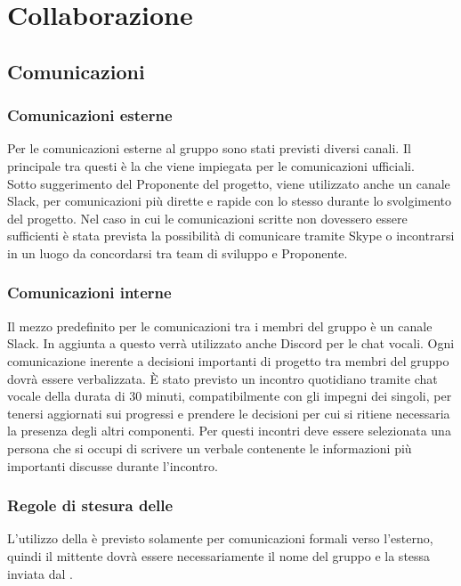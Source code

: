 \section{Collaborazione}
\subsection{Comunicazioni}
\subsubsection{Comunicazioni esterne}
Per le comunicazioni esterne al gruppo sono stati previsti diversi canali.
Il principale tra questi è la \email{} \href{mailto:\GroupEmail}{\GroupEmail}{} che viene impiegata per le comunicazioni ufficiali.\\
Sotto suggerimento del Proponente del progetto, viene utilizzato anche un canale Slack, per comunicazioni più dirette e rapide con lo stesso durante lo svolgimento del progetto. Nel caso in cui le comunicazioni scritte non dovessero essere sufficienti è stata prevista la possibilità di comunicare tramite Skype o incontrarsi in un luogo da concordarsi tra team di sviluppo e Proponente.

\subsubsection{Comunicazioni interne} \label{sec:comunicazioni_interne}
Il mezzo predefinito per le comunicazioni tra i membri del gruppo è un canale Slack.
In aggiunta a questo verrà utilizzato anche Discord per le chat vocali.
Ogni comunicazione inerente a decisioni importanti di progetto tra membri del gruppo dovrà essere verbalizzata.
È stato previsto un incontro quotidiano tramite chat vocale della durata di 30 minuti, compatibilmente con gli impegni dei singoli, per tenersi aggiornati sui progressi e prendere le decisioni per cui si ritiene necessaria la presenza degli altri componenti. Per questi incontri deve essere selezionata una persona che si occupi di scrivere un verbale contenente le informazioni più importanti discusse durante l'incontro.

\subsubsection{Regole di stesura delle \email}
L'utilizzo della \email{} è previsto solamente per comunicazioni formali verso l'esterno, quindi il mittente dovrà essere necessariamente il nome del gruppo e la stessa \email{} inviata dal \Responsabile.

